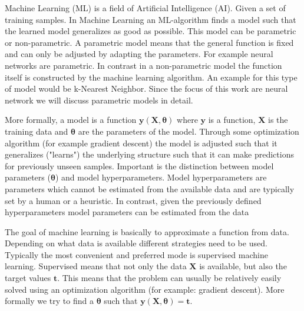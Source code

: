 \documentclass[draft,final,oneside]{vutinfth} %
\begin{document}


Machine Learning (ML) is a field of Artificial Intelligence (AI). Given a set of training samples. In Machine Learning an ML-algorithm finds a model such that the learned model generalizes as good as possible. This model can be parametric or non-parametric. A parametric model means that the general function is fixed and can only be adjusted by adapting the parameters. For example neural networks are parametric. In contrast in a non-parametric model the function itself is constructed by the machine learning algorithm. An example for this type of model would be k-Nearest Neighbor. Since the focus of this work are neural network we will discuss parametric models in detail.

More formally, a model is a function $\boldsymbol{y}(\boldsymbol{X}, \boldsymbol{\theta})$ where $\boldsymbol{y}$ is a function, $\boldsymbol{X}$ is the training data and $\boldsymbol{\theta}$ are the parameters of the model. Through some optimization algorithm (for example gradient descent) the model is adjusted such that it generalizes ("learns") the underlying structure such that it can make predictions for previously unseen samples. Important is the distinction between model parameters ($\boldsymbol{\theta}$) and model hyperparameters. Model hyperparameters are parameters which cannot be estimated from the available data and are typically set by a human or a heuristic. In contrast, given the previously defined hyperparameters model parameters can be estimated from the data


The goal of machine learning is basically to approximate a function from data. Depending on what data is available different strategies need to be used. Typically the most convenient and preferred mode is supervised machine learning. Supervised means that not only the data $\boldsymbol{X}$ is available, but also the target values $\boldsymbol{t}$. This means that the problem can usually be relatively easily solved using an optimization algorithm (for example: gradient descent). More formally we try to find a $\boldsymbol{\theta}$ such that $\boldsymbol{y}(\boldsymbol{X}, \boldsymbol{\theta}) = \boldsymbol{t}$.
\end{document}
